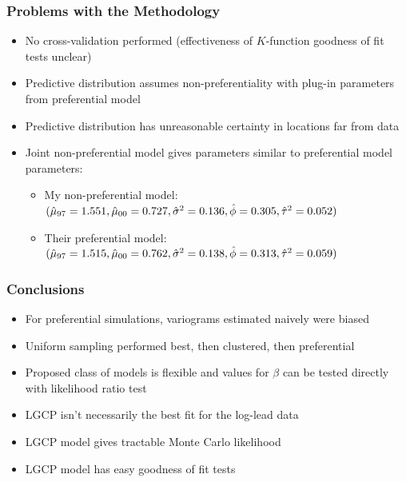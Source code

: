 \documentclass[xcolor=svgnames]{beamer}
\begin{document}
\begin{frame}
\frametitle{Problems with the Methodology}
\begin{itemize}
\item No cross-validation performed (effectiveness of $K$-function goodness of fit tests unclear)
\item Predictive distribution assumes non-preferentiality with plug-in parameters from preferential model
\item Predictive distribution has unreasonable certainty in locations far from data
\item Joint non-preferential model gives parameters similar to preferential model parameters:
\begin{itemize}
\item My non-preferential model: \\
$(\hat{\mu}_{97} = 1.551, \hat{\mu}_{00} = 0.727, \hat{\sigma}^2=0.136, \hat{\phi}=0.305, \hat{\tau}^2=0.052)$
\item Their preferential model: \\
$(\hat{\mu}_{97} = 1.515, \hat{\mu}_{00} = 0.762, \hat{\sigma}^2=0.138, \hat{\phi}=0.313, \hat{\tau}^2=0.059)$
\end{itemize}
\end{itemize}
\end{frame}
\begin{frame}
\frametitle{Conclusions}
\begin{itemize}
\item For preferential simulations, variograms estimated naively were biased
\item Uniform sampling performed best, then clustered, then preferential
\item Proposed class of models is flexible and values for $\beta$ can be tested directly with likelihood ratio test
\item LGCP isn't necessarily the best fit for the log-lead data
\item LGCP model gives tractable Monte Carlo likelihood
\item LGCP model has easy goodness of fit tests
\end{itemize}
\end{frame}
\end{document}
